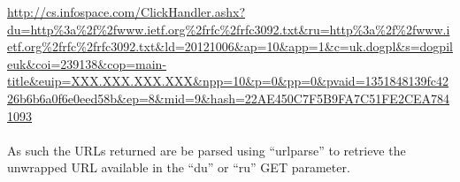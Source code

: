 \url{http://cs.infospace.com/ClickHandler.ashx?du=http%
}

\paragraph{}
As such the URLs returned are be parsed using ``urlparse'' to retrieve the unwrapped URL available in the ``du'' or ``ru'' GET parameter\cite{rfc3092}.